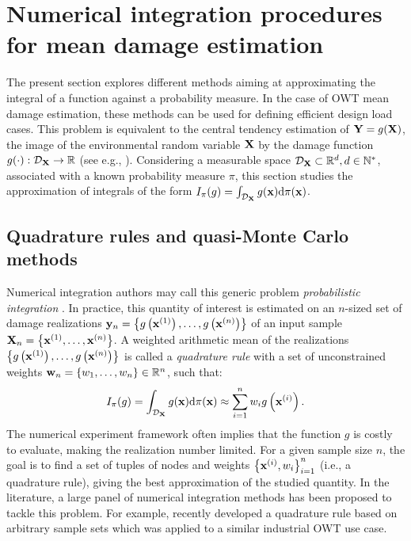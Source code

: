 \section{Numerical integration procedures for mean damage estimation}\label{sec:sec43}
The present section explores different methods aiming at approximating the integral of a function against a probability measure. 
In the case of OWT mean damage estimation, these methods can be used for defining efficient design load cases. 
This problem is equivalent to the central tendency estimation of ${\bf Y} = g({\bf X})$, the image of the environmental random variable ${\bf X}$ by the damage function $g(\cdot): \mathcal{D}_{\bf X} \to \mathbb{R}$ (see e.g., ). 
Considering a measurable space $\mathcal{D}_{\bf X} \subset \mathbb{R}^d, d \in \mathbb{N}^*$, associated with a known probability measure $\pi$, this section studies the approximation of integrals of the form $I_{\pi}(g)=\int_{\mathcal{D}_{\bf X}} g({\bf x}) \mathrm{d}\pi({\bf x})$. 
\subsection{Quadrature rules and quasi-Monte Carlo methods}
Numerical integration authors may call this generic problem \emph{probabilistic integration} \citep{briol_oates_2019}. 
In practice, this quantity of interest is estimated on an $n$-sized set of damage realizations ${\bf y}_n = \left\{g\left({\bf x}^{(1)}\right), \dots, g\left({\bf x}^{(n)}\right)\right\}$ of an input sample ${\bf X}_n = \left\{{\bf x}^{(1)}, \dots, {\bf x}^{(n)}\right\}$. 
A weighted arithmetic mean of the realizations $\left\{g\left({\bf x}^{(1)}\right), \dots, g\left({\bf x}^{(n)}\right)\right\}$ is called a \emph{quadrature rule} with a set of unconstrained weights ${\bf w}_n = \{w_1, \dots, w_n\} \in \mathbb{R}^n$, such that:
\begin{equation}
    I_{\pi}(g) = \int_{\mathcal{D}_{\bf X}} g({\bf x}) \mathrm{d}\pi({\bf x}) \approx \sum_{i=1}^n w_i g\left({\bf x}^{(i)}\right).
    \label{eq:quadrature_rule}
\end{equation}
The numerical experiment framework often implies that the function $g$ is costly to evaluate, making the realization number limited. 
For a given sample size $n$, the goal is to find a set of tuples of nodes and weights $\left\{{\bf x}^{(i)}, w_i \right\}_{i=1}^n$ (i.e., a quadrature rule), giving the best approximation of the studied quantity. 
In the literature, a large panel of numerical integration methods has been proposed to tackle this problem. 
For example, \cite{bos_2020} recently developed a quadrature rule based on arbitrary sample sets which was applied to a similar industrial OWT use case.  

